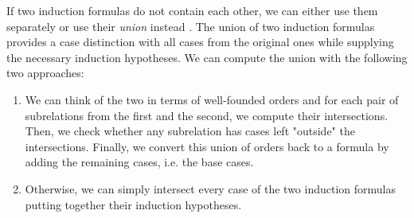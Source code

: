 If two induction formulas do not contain each other, we can either use them separately or use their \textit{union} instead \cite{combining}. The union of two induction formulas provides a case distinction with all cases from the original ones while supplying the necessary induction hypotheses. We can compute the union with the following two approaches:
\begin{enumerate}
	\item We can think of the two in terms of well-founded orders and for each pair of subrelations from the first and the second, we compute their intersections. Then, we check whether any subrelation has cases left "outside" the intersections. Finally, we convert this union of orders back to a formula by adding the remaining cases, i.e. the base cases.
	\item Otherwise, we can simply intersect every case of the two induction formulas putting together their induction hypotheses.
\end{enumerate}
